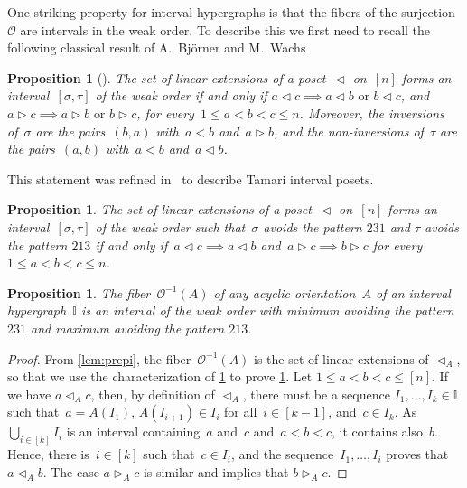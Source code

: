 \documentclass[reqno]{amsart}
\newtheorem{proposition}[theorem]{Proposition}
\theoremstyle{definition}
\newcommand{\less}{\vartriangleleft} %
\newcommand{\more}{\vartriangleright} %
\newcommand{\Or}{\mathcal O}  %
\newcommand{\II}{\mathbb I} %
\begin{document}
One striking property for interval hypergraphs is that the fibers of the surjection~$\Or$ are intervals in the weak order.
To describe this we first need to recall the following classical result of A.~Bj\"orner and M.~Wachs~\cite[Thm.~6.8]{BjornerWachs}

\begin{proposition}[{\cite[Thm.~6.8]{BjornerWachs}}]
\label{prop:WOIP}
The set of linear extensions of a poset~$\less$ on~$[n]$ forms an interval~$[\sigma, \tau]$ of the weak order if and only if ${a \less c \implies a \less b \text{ or } b \less c}$, and~${a \more c \implies a \more b \text{ or } b \more c}$, for every~$1 \le a < b < c \le n$.
Moreover, the inversions of~$\sigma$ are the pairs~$(b,a)$ with~$a < b$ and~$a \more b$, and the non-inversions of~$\tau$ are the pairs~$(a,b)$ with~$a < b$ and~$a \less b$.
\end{proposition}

This statement was refined in~\cite{ChatelPilaudPons} to describe Tamari interval posets.

\begin{proposition}
\label{prop:TOIP}
The set of linear extensions of a poset~$\less$ on~$[n]$ forms an interval~$[\sigma, \tau]$ of the weak order such that~$\sigma$ avoids the pattern $231$ and $\tau$ avoids the pattern $213$ if and only if~${a \less c \implies a \less b}$ and~$a \more c \implies b \more c$ for every~$1 \le a < b < c \le n$.
\end{proposition}

\begin{proposition}
\label{prop:preimageI}
The fiber~$\Or^{-1}(A)$ of any acyclic orientation~$A$ of an interval hypergraph~$\II$ is an interval of the weak order with minimum avoiding the pattern $231$ and maximum avoiding the pattern $213$.
\end{proposition}

\begin{proof}
From \cref{lem:prepi}, the fiber~$\Or^{-1}(A)$ is the set of linear extensions of $\less_A$, so that we use the characterization of \cref{prop:TOIP} to prove \cref{prop:preimageI}.
Let $1 \le a < b < c \le [n]$.
If we have $a \less_{A} c$, then, by definition of $\less_A$, there must be a sequence $I_1, \dots, I_k \in \II$ such that~$a = A(I_1)$, $A(I_{i+1}) \in I_i$ for all~$i \in [k-1]$, and~$c \in I_k$.
As $\bigcup_{i \in [k]} I_i$ is an interval containing~$a$ and~$c$ and~$a < b < c$, it contains also~$b$.
Hence, there is~$i \in [k]$ such that~$c \in I_i$, and the sequence~$I_1, \dots, I_i$ proves that~$a \less_{A} b$.
The case $a \more_{A} c$ is similar and  implies that $b \more_A c$.
\end{proof}
\end{document}
